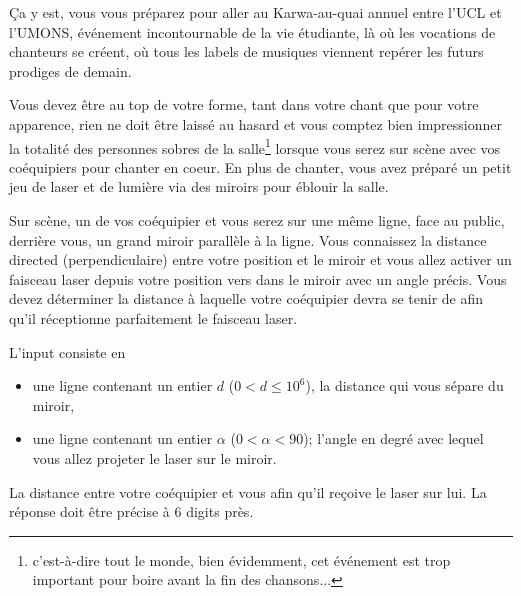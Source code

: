 \problemname{\problemyamlname}

Ça y est, vous vous préparez pour aller au Karwa-au-quai annuel entre l'UCL et l'UMONS, événement incontournable de la vie étudiante, là où les vocations de chanteurs se créent, où tous les labels de musiques viennent repérer les futurs prodiges de demain.

Vous devez être au top de votre forme, tant dans votre chant que pour votre apparence, rien ne doit être laissé au hasard et vous comptez bien impressionner la totalité des personnes sobres de la salle\footnote{c'est-à-dire tout le monde, bien évidemment, cet événement est trop important pour boire avant la fin des chansons...} lorsque vous serez sur scène avec vos coéquipiers pour chanter en coeur. En plus de chanter, vous avez préparé un petit jeu de laser et de lumière via des miroirs pour éblouir la salle.

Sur scène, un de vos coéquipier et vous serez sur une même ligne, face au public, derrière vous, un grand miroir parallèle à la ligne. Vous connaissez la distance directed (perpendiculaire) entre votre position et le miroir et vous allez activer un faisceau laser depuis votre position vers dans le miroir avec un angle précis. Vous devez déterminer la distance à laquelle votre coéquipier devra se tenir de afin qu'il réceptionne parfaitement le faisceau laser.

\begin{Input}
    L'input consiste en
    \begin{itemize}
        \item une ligne contenant un entier $d$ ($0<d\leq 10^6$), la distance qui vous sépare du miroir,
        \item une ligne contenant un entier $\alpha$ ($0<\alpha<90$); l'angle en degré avec lequel vous allez projeter le laser sur le miroir.
    \end{itemize}
\end{Input}

\begin{Output}
    La distance entre votre coéquipier et vous afin qu'il reçoive le laser sur lui. La réponse doit être précise à $6$ digits près.
\end{Output}
